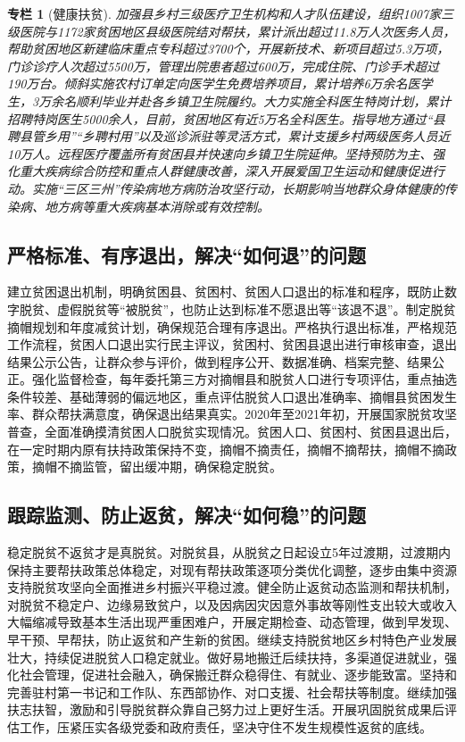\documentclass{ctexart}
\newtheorem{zhuanlan}{专栏}
\begin{document}
\begin{zhuanlan}[健康扶贫]
    加强县乡村三级医疗卫生机构和人才队伍建设，组织1007家三级医院与1172家贫困地区县级医院结对帮扶，累计派出超过11.8万人次医务人员，帮助贫困地区新建临床重点专科超过3700个，开展新技术、新项目超过5.3万项，门诊诊疗人次超过5500万，管理出院患者超过600万，完成住院、门诊手术超过190万台。倾斜实施农村订单定向医学生免费培养项目，累计培养6万余名医学生，3万余名顺利毕业并赴各乡镇卫生院履约。大力实施全科医生特岗计划，累计招聘特岗医生5000余人，目前，贫困地区有近5万名全科医生。指导地方通过“县聘县管乡用”“乡聘村用”以及巡诊派驻等灵活方式，累计支援乡村两级医务人员近10万人。远程医疗覆盖所有贫困县并快速向乡镇卫生院延伸。坚持预防为主、强化重大疾病综合防控和重点人群健康改善，深入开展爱国卫生运动和健康促进行动。实施“三区三州”传染病地方病防治攻坚行动，长期影响当地群众身体健康的传染病、地方病等重大疾病基本消除或有效控制。
    \label{col-11}
\end{zhuanlan}

\subsection{严格标准、有序退出，解决“如何退”的问题}

建立贫困退出机制，明确贫困县、贫困村、贫困人口退出的标准和程序，既防止数字脱贫、虚假脱贫等“被脱贫”，也防止达到标准不愿退出等“该退不退”。制定脱贫摘帽规划和年度减贫计划，确保规范合理有序退出。严格执行退出标准，严格规范工作流程，贫困人口退出实行民主评议，贫困村、贫困县退出进行审核审查，退出结果公示公告，让群众参与评价，做到程序公开、数据准确、档案完整、结果公正。强化监督检查，每年委托第三方对摘帽县和脱贫人口进行专项评估，重点抽选条件较差、基础薄弱的偏远地区，重点评估脱贫人口退出准确率、摘帽县贫困发生率、群众帮扶满意度，确保退出结果真实。2020年至2021年初，开展国家脱贫攻坚普查，全面准确摸清贫困人口脱贫实现情况。贫困人口、贫困村、贫困县退出后，在一定时期内原有扶持政策保持不变，摘帽不摘责任，摘帽不摘帮扶，摘帽不摘政策，摘帽不摘监管，留出缓冲期，确保稳定脱贫。

\subsection{跟踪监测、防止返贫，解决“如何稳”的问题}

稳定脱贫不返贫才是真脱贫。对脱贫县，从脱贫之日起设立5年过渡期，过渡期内保持主要帮扶政策总体稳定，对现有帮扶政策逐项分类优化调整，逐步由集中资源支持脱贫攻坚向全面推进乡村振兴平稳过渡。健全防止返贫动态监测和帮扶机制，对脱贫不稳定户、边缘易致贫户，以及因病因灾因意外事故等刚性支出较大或收入大幅缩减导致基本生活出现严重困难户，开展定期检查、动态管理，做到早发现、早干预、早帮扶，防止返贫和产生新的贫困。继续支持脱贫地区乡村特色产业发展壮大，持续促进脱贫人口稳定就业。做好易地搬迁后续扶持，多渠道促进就业，强化社会管理，促进社会融入，确保搬迁群众稳得住、有就业、逐步能致富。坚持和完善驻村第一书记和工作队、东西部协作、对口支援、社会帮扶等制度。继续加强扶志扶智，激励和引导脱贫群众靠自己努力过上更好生活。开展巩固脱贫成果后评估工作，压紧压实各级党委和政府责任，坚决守住不发生规模性返贫的底线。
\end{document}

